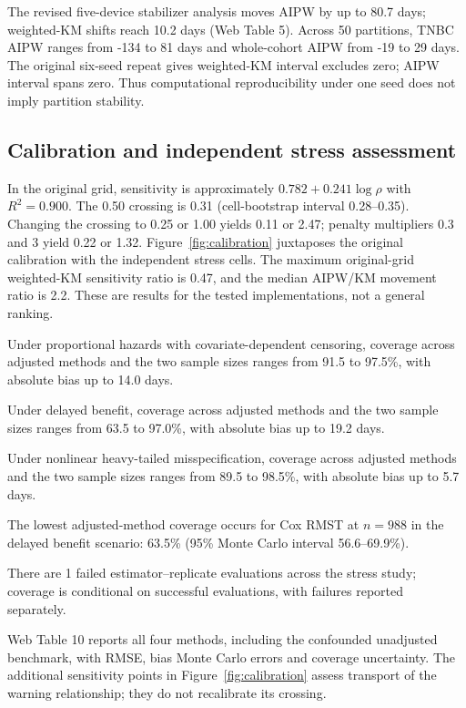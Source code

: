 \documentclass[12pt,letterpaper]{article}
\begin{document}
The revised five-device stabilizer analysis moves AIPW by up to 80.7 days;
weighted-KM shifts reach 10.2 days (Web Table 5).
Across 50 partitions, TNBC AIPW ranges from -134 to 81 days and whole-cohort AIPW from -19 to 29 days.
The original six-seed repeat gives weighted-KM interval excludes zero; AIPW interval spans zero.
Thus computational reproducibility under one seed does not imply partition stability.

\subsection{Calibration and independent stress assessment}
In the original grid, sensitivity is approximately $0.782+0.241\log\rho$
with $R^2=0.900$. The 0.50 crossing is 0.31 (cell-bootstrap interval 0.28--0.35).
Changing the crossing to 0.25 or 1.00 yields 0.11 or 2.47;
penalty multipliers 0.3 and 3 yield 0.22 or 1.32.
Figure~\ref{fig:calibration} juxtaposes the original calibration with the independent stress cells.
The maximum original-grid weighted-KM sensitivity ratio is 0.47, and the median AIPW/KM
movement ratio is 2.2. These are results for the tested implementations, not a general ranking.

Under proportional hazards with covariate-dependent censoring, coverage across adjusted methods and the two sample sizes ranges from 91.5 to 97.5\%, with absolute bias up to 14.0 days.

Under delayed benefit, coverage across adjusted methods and the two sample sizes ranges from 63.5 to 97.0\%, with absolute bias up to 19.2 days.

Under nonlinear heavy-tailed misspecification, coverage across adjusted methods and the two sample sizes ranges from 89.5 to 98.5\%, with absolute bias up to 5.7 days.

The lowest adjusted-method coverage occurs for Cox RMST at $n=988$ in the delayed benefit scenario: 63.5\% (95\% Monte Carlo interval 56.6--69.9\%).

There are 1 failed estimator--replicate evaluations across the stress study; coverage is conditional on successful evaluations, with failures reported separately.

Web Table 10 reports all four methods, including the confounded unadjusted benchmark, with RMSE, bias Monte Carlo errors and coverage uncertainty. The additional sensitivity points in Figure~\ref{fig:calibration} assess transport of the warning relationship; they do not recalibrate its crossing.
\end{document}
